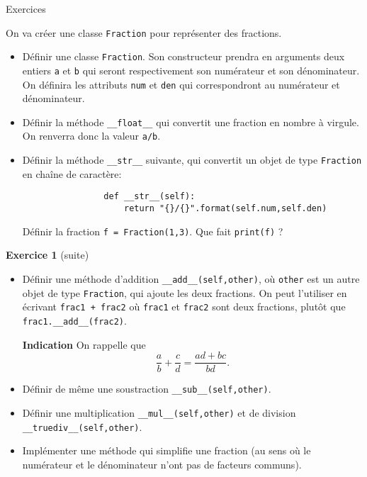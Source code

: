 \begin{frame}[fragile]{Exercices}
	\begin{exo}[Fractions]
		On va créer une classe \lstinline|Fraction| pour représenter des fractions.\pause
		\begin{itemize}
			\item Définir une classe \lstinline|Fraction|. Son constructeur prendra en arguments deux entiers \lstinline|a| et \lstinline|b| qui seront respectivement son numérateur et son dénominateur. On définira les attributs \lstinline|num| et \lstinline|den| qui correspondront au numérateur et dénominateur.\pause
			\item Définir la méthode \lstinline|__float__| qui convertit une fraction en nombre à virgule. On renverra donc la valeur \lstinline|a/b|.\pause
			\item Définir la méthode \lstinline|__str__| suivante, qui convertit un objet de type \lstinline|Fraction| en chaîne de caractère:\pause
			\begin{lstlisting}
				def __str__(self):
					return "{}/{}".format(self.num,self.den)
			\end{lstlisting}\pause
			Définir la fraction \lstinline|f = Fraction(1,3)|. Que fait \lstinline|print(f)| ?
		\end{itemize}
	\end{exo}
\end{frame}

\begin{frame}[fragile]
	\begin{block}{\textbf{Exercice 1} (suite)}
		\begin{itemize}
			\item Définir une méthode d'addition \lstinline|__add__(self,other)|, où \lstinline|other| est un autre objet de type \lstinline|Fraction|, qui ajoute les deux fractions. On peut l'utiliser en écrivant \lstinline|frac1 + frac2| où \lstinline|frac1| et \lstinline|frac2| sont deux fractions, plutôt que \lstinline|frac1.__add__(frac2)|.\pause

			\textbf{Indication} On rappelle que
			\[
			\frac a b + \frac c d = \frac{ad + bc}{bd}.
			\]\pause
			\item Définir de même une soustraction \lstinline|__sub__(self,other)|.\pause
			\item Définir une multiplication \lstinline|__mul__(self,other)| et de division \lstinline|__truediv__(self,other)|.
			\item Implémenter une méthode qui simplifie une fraction (au sens où le numérateur et le dénominateur n'ont pas de facteurs communs).
		\end{itemize}
	\end{block}
\end{frame}


